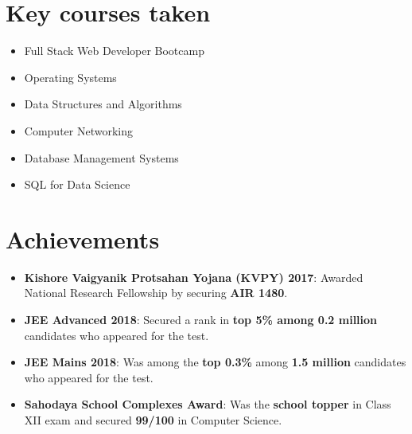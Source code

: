 \documentclass[a4paper,10pt]{report}
\newcommand{\resumeItem}[2]{
  \item\small{
    \textbf{#1}{: #2 \vspace{-2pt}}
  }
}
\newcommand{\resumeSubItem}[2]{\resumeItem{#1}{#2}\vspace{-4pt}}
\newcommand{\resumeSubHeadingListStart}{\begin{itemize}[leftmargin=*]}
\newcommand{\resumeSubHeadingListEnd}{\end{itemize}}
\begin{document}
 \section{Key courses taken}
\vspace{-2pt}
 \begin{multicols}{2}
 \begin{itemize}[leftmargin = *,itemsep=-3pt]
 
\item Full Stack Web Developer Bootcamp
\item Operating Systems
\item Data Structures and Algorithms
%
\item Computer Networking
\item Database Management Systems
\item SQL for Data Science

\end{itemize}
\end{multicols}
 
\vspace{-1pt}
\section{Achievements}
\resumeSubHeadingListStart
\resumeSubItem{Kishore Vaigyanik Protsahan Yojana (KVPY) 2017}{Awarded National Research Fellowship by securing \textbf{AIR 1480}.}
\vspace{2pt}
\resumeSubItem{JEE Advanced 2018}{Secured a rank in \textbf{top 5\% among 0.2 million} candidates who appeared for the test.}
\vspace{2pt}
\resumeSubItem{JEE Mains 2018}{Was among the \textbf{top 0.3\%} among \textbf{1.5 million} candidates who appeared for the test.}
\vspace{2pt}
\resumeSubItem{Sahodaya School Complexes Award}{Was the \textbf{school topper} in Class XII exam and secured \textbf{99/100} in Computer Science.}
\resumeSubHeadingListEnd
 
 
\end{document}
